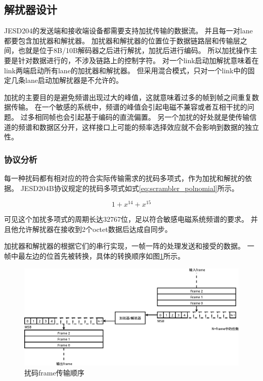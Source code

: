 \documentclass[UTF8]{ctexart}
\begin{document}
\subsection{解扰器设计}

JESD204的发送端和接收端设备都需要支持加扰传输的数据流。
并且每一对lane都要包含加扰器和解扰器。
加扰器和解扰器的位置位于数据链路层和传输层之间，也就是位于8B/10B解码器之后进行解扰，加扰后进行编码。
所以加扰操作主要是针对数据进行的，不涉及链路上的控制字符。
对一个link启动加解扰意味着在link两端启动所有lane的加扰器和解扰器。
但采用混合模式，只对一个link中的固定几条lane启动加解扰器是不允许的。

加扰的主要目的是避免频谱出现过大的峰值，这就意味着过多的帧到帧之间重复数据传输。
在一个敏感的系统中，频谱的峰值会引起电磁不兼容或者互相干扰的问题。
过多相同帧也会引起基于编码的直流偏置。
另一个加扰的好处就是使传输信道的频谱和数据区分开，这样接口上可能的频率选择效应就不会影响到数据的独立性。

\subsubsection{协议分析}

每一种扰码都有相对应的符合实际传输需求的扰码多项式，作为加扰和解扰的依据。
JESD204B协议规定的扰码多项式如式\ref{eq:scrambler_polnomial}所示。

\begin{equation}
\label{eq:scrambler_polnomial}
1+x^{14}+x^{15}
\end{equation}

可见这个加扰多项式的周期长达32767位，足以符合敏感电磁系统频谱的要求。
并且他允许解扰器在接收到2个octet数据后达成自同步。

加扰器和解扰器的根据它们的串行实现，一帧一阵的处理发送和接受的数据。
一帧中最左边的位首先被转换，具体的转换顺序如图\ref{fig:serial_scrambling}所示。

\begin{figure}[H]
\centering
\includegraphics[width=18cm]{./img/serial_scrambling.pdf}
\caption{扰码frame传输顺序}
\label{fig:serial_scrambling}
\end{figure}
\end{document}
